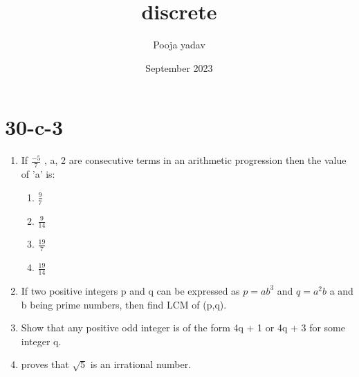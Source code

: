 \documentclass{article}
\title{discrete}
\author{Pooja yadav}
\date{September 2023}
\begin{document}
\maketitle
\section{30-c-3}

\begin{enumerate}

\item If  \(\frac{-5}{7}\)
 , a, 2 are consecutive terms in an arithmetic progression then the value of 'a' is:
   \begin{enumerate}
    
    \item \(\frac{9}{7}\)
    \item \(\frac{9}{14}\)
    \item \(\frac{19}{7}\)
    \item \(\frac{19}{14}\)


\end{enumerate}

 \item If two positive integers p and q can be expressed as $p = ab^3$ and $q = a^2b$ a and b being prime numbers, then find LCM of (p,q).

\item Show that any positive odd integer is of the form 4q + 1 or 4q + 3 for some integer q.
\item proves that $\sqrt{5}$ is an irrational number.


\end{enumerate}
\end{document}

